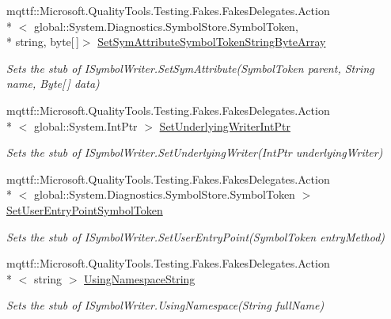 \begin{DoxyCompactItemize}
mqttf\-::\-Microsoft.\-Quality\-Tools.\-Testing.\-Fakes.\-Fakes\-Delegates.\-Action\\*
$<$ global\-::\-System.\-Diagnostics.\-Symbol\-Store.\-Symbol\-Token, \\*
string, byte\mbox{[}$\,$\mbox{]}$>$ \hyperlink{class_system_1_1_diagnostics_1_1_symbol_store_1_1_fakes_1_1_stub_i_symbol_writer_a18844f78fd4915bd440ec664e2e778b7}{Set\-Sym\-Attribute\-Symbol\-Token\-String\-Byte\-Array}
\begin{DoxyCompactList}\small\item\em Sets the stub of I\-Symbol\-Writer.\-Set\-Sym\-Attribute(\-Symbol\-Token parent, String name, Byte\mbox{[}$\,$\mbox{]} data)\end{DoxyCompactList}\item 
mqttf\-::\-Microsoft.\-Quality\-Tools.\-Testing.\-Fakes.\-Fakes\-Delegates.\-Action\\*
$<$ global\-::\-System.\-Int\-Ptr $>$ \hyperlink{class_system_1_1_diagnostics_1_1_symbol_store_1_1_fakes_1_1_stub_i_symbol_writer_ade5d39aca72755ad4564e92a567e2241}{Set\-Underlying\-Writer\-Int\-Ptr}
\begin{DoxyCompactList}\small\item\em Sets the stub of I\-Symbol\-Writer.\-Set\-Underlying\-Writer(\-Int\-Ptr underlying\-Writer)\end{DoxyCompactList}\item 
mqttf\-::\-Microsoft.\-Quality\-Tools.\-Testing.\-Fakes.\-Fakes\-Delegates.\-Action\\*
$<$ global\-::\-System.\-Diagnostics.\-Symbol\-Store.\-Symbol\-Token $>$ \hyperlink{class_system_1_1_diagnostics_1_1_symbol_store_1_1_fakes_1_1_stub_i_symbol_writer_aed04a2d310776cd5094f86c3586b3f4b}{Set\-User\-Entry\-Point\-Symbol\-Token}
\begin{DoxyCompactList}\small\item\em Sets the stub of I\-Symbol\-Writer.\-Set\-User\-Entry\-Point(\-Symbol\-Token entry\-Method)\end{DoxyCompactList}\item 
mqttf\-::\-Microsoft.\-Quality\-Tools.\-Testing.\-Fakes.\-Fakes\-Delegates.\-Action\\*
$<$ string $>$ \hyperlink{class_system_1_1_diagnostics_1_1_symbol_store_1_1_fakes_1_1_stub_i_symbol_writer_af95fb17ae1449e0cb68ddeb5b34a355b}{Using\-Namespace\-String}
\begin{DoxyCompactList}\small\item\em Sets the stub of I\-Symbol\-Writer.\-Using\-Namespace(\-String full\-Name)\end{DoxyCompactList}\end{DoxyCompactItemize}


